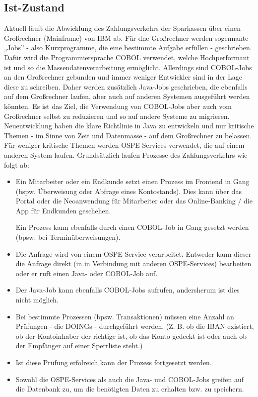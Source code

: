 \subsection{Ist-Zustand}
\label{sec:ist-zustand}
Aktuell läuft die Abwicklung des Zahlungsverkehrs der Sparkassen über einen Großrechner (Mainframe) von IBM ab.
Für dne Großrechner werden sogennante „Jobs” - also Kurzprogramme, die eine bestimmte Aufgabe erfüllen - geschrieben. Dafür wird die Programmiersprache COBOL verwendet, welche Hochperformant ist und so die Massendatenverarbeitung ermöglicht.
Allerdings sind COBOL-Jobs an den Großrechner gebunden und immer weniger Entwickler sind in der Lage diese zu schreiben.
Daher werden zusätzlich Java-Jobs geschrieben, die ebenfalls auf dem Großrechner laufen, aber auch auf anderen Systemen ausgeführt werden könnten.
Es ist das Ziel, die Verwendung von COBOL-Jobs aber auch vom Großrechner selbst zu reduzieren und so auf andere Systeme zu migrieren.
Neuentwicklung haben die klare Richtlinie in Java zu entwickeln und nur kritische Themen - im Sinne von Zeit und Datenmasse - auf dem Großrechner zu belassen.
Für weniger kritische Themen werden OSPE-Services verwendet, die auf einem anderen System laufen.
Grundsätzlich laufen Prozesse des Zahlungsverkehrs wie folgt ab:
\begin{itemize}
    \item Ein Mitarbeiter oder ein Endkunde setzt einen Prozess im Frontend in Gang (bspw. Überweisung oder Abfrage eines Kontostands).
    Dies kann über das Portal oder die Neoanwendung für Mitarbeiter oder das Online-Banking / die App für Endkunden geschehen.

    Ein Prozess kann ebenfalls durch einen COBOL-Job in Gang gesetzt werden (bpsw. bei Terminüberweisungen).
    \item Die Anfrage wird von einem OSPE-Service verarbeitet.
    Entweder kann dieser die Anfrage direkt (in in Verbindung mit anderen OSPE-Services) bearbeiten oder er ruft einen Java- oder COBOL-Job auf.
    \item Der Java-Job kann ebenfalls COBOL-Jobs aufrufen, andersherum ist dies nicht möglich.
    \item Bei bestimmte Prozessen (bpsw. Transaktionen) müssen eine Anzahl an Prüfungen - die DOINGs - durchgeführt werden. 
    (Z. B. ob die IBAN existiert, ob der Kontoinhaber der richtige ist, ob das Konto gedeckt ist oder auch ob der Empfänger auf einer Sperrliste steht.) 
    \item Ist diese Prüfung erfolreich kann der Prozess fortgesetzt werden.
    \item Sowohl die OSPE-Services als auch die Java- und COBOL-Jobs greifen auf die Datenbank zu, um die benötigten Daten zu erhalten bzw. zu speichern. 
\end{itemize}

